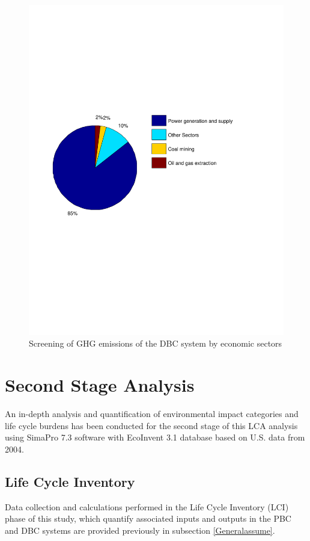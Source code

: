 \documentclass[3p,times,procedia]{elsarticle}
\begin{document}
\begin{figure}[t]
\includegraphics[width=\linewidth]{g.pdf}
\caption{Screening of GHG emissions of the DBC system by economic sectors}
\label{screecn4Sectors}
\endminipage\hfill
\end{figure}

\section{Second Stage Analysis}
An in-depth analysis and quantification of environmental impact categories and life cycle burdens has been conducted for the second stage of this LCA analysis using SimaPro 7.3 software with EcoInvent 3.1 database based on U.S. data from 2004.

\subsection{Life Cycle Inventory}

Data collection and calculations performed in the Life Cycle Inventory (LCI) phase of this study, which quantify associated inputs and outputs in the PBC and DBC systems are provided previously in subsection \ref{Generalassume}.\\
\end{document}
